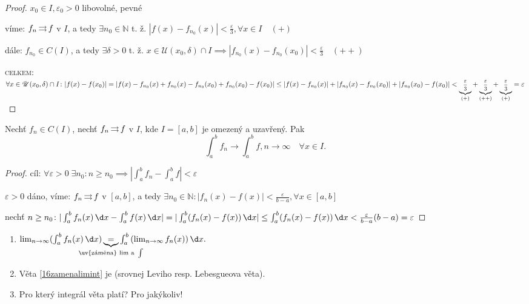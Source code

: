 \begin{proof}
  $x_0 \in I, \varepsilon_0 >0$ libovolné, pevné

  víme: $f_n \operatorname{\rightrightarrows} f$ v $I$, a tedy $\exists n_0 \in \mathbb N$ t. ž. $|f(x)-f_{n_0}(x)|<\frac{\varepsilon}{3}, \forall x \in I \quad (+)$

  dále: $f_{n_0} \in C(I)$, a tedy $\exists \delta > 0$ t. ž. $x \in \mathscr U(x_0,\delta) \cap I \implies |f_{n_0}(x)-f_{n_0}(x_0)|<\frac{\varepsilon}{3} \quad (++)$

  \textsc{celkem}: $\forall x \in \mathscr U(x_0, \delta) \cap I\colon |f(x)-f(x_0)|=|f(x)-f_{n_0}(x)+f_{n_0}(x)-f_{n_0}(x_0)+f_{n_0}(x_0)-f(x_0)| \leq |f(x)-f_{n_0}(x)|+|f_{n_0}(x)-f_{n_0}(x_0)|+|f_{n_0}(x_0)-f(x_0)|<\footnotesize\underbrace{\frac{\varepsilon}{3}}_{(+)}+\underbrace{\frac{\varepsilon}{3}}_{(++)}+\underbrace{\frac{\varepsilon}{3}}_{(+)}=\varepsilon$
\end{proof}

\begin{veta}\label{16zamenalimint}
  Nechť $f_n \in C(I)$, nechť $f_n \operatorname{\rightrightarrows} f$ v $I$, kde $I=[a,b]$ je omezený a uzavřený. Pak
  $$\int_a^b f_n \to \int_a^b f, n \to \infty \quad \forall x \in I.$$
\end{veta}

\begin{proof}
  cíl: $\forall \varepsilon > 0 \; \exists n_0 \colon n \geq n_0 \implies |\int_a^b f_n - \int_a^b f|<\varepsilon$

  $\varepsilon > 0$ dáno, víme: $f_n \operatorname{\rightrightarrows} f$ v $[a, b]$, a tedy $\exists n_0 \in \mathbb N\colon |f_n(x)-f(x)|<\frac{\varepsilon}{b-a}, \forall x \in [a,b]$

  nechť $n \geq n_0\colon |\int_a^b f_n(x) \,\d x - \int_a^b f(x) \,\d x|=|\int_a^b(f_n(x)-f(x)) \,\d x| \leq \int_a^b (f_n(x)-f(x)) \,\d x < \frac{\varepsilon}{b-a}(b-a)=\varepsilon$
\end{proof}

\begin{poznamka}
  \begin{enumerate}
    \item $\lim_{n \to \infty}(\int_a^b f_n(x) \,\d x)\underbrace{=}_{\mathclap{\text{\uv{záměna} lim a } \int}}\int_a^b \left(\lim_{n\to \infty} f_n(x)\right)\d x.$
    \item Věta \ref{16zamenalimint} je  (srovnej Leviho resp. Lebesgueova věta).
    \item Pro který integrál věta platí? Pro jakýkoliv!
  \end{enumerate}
\end{poznamka}

